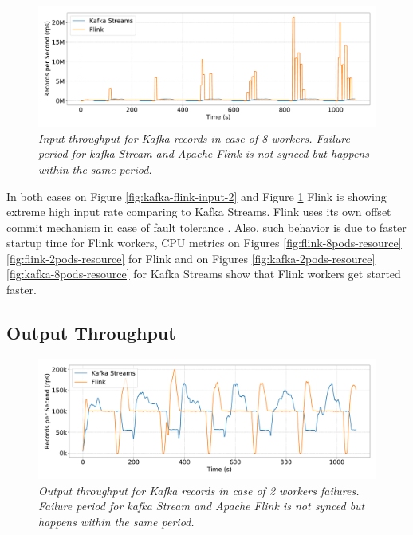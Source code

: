 \begin{figure}[H]
    \centering
    \includegraphics[width=1\textwidth]{figures/kafka-flink/input-throughput-8pod-kafka-flink}
    \caption{\textit{Input throughput for Kafka records in case of 8 workers.
    Failure period for kafka Stream and Apache Flink is not synced but happens within the same period.}}
    \label{fig:kafka-flink-input-8}
\end{figure}


In both cases on Figure \ref{fig:kafka-flink-input-2} and Figure \ref{fig:kafka-flink-input-8}
Flink is showing extreme high input rate comparing to Kafka Streams.
Flink uses its own offset commit mechanism in case of fault tolerance \cite{flink_kafka_offset}.
Also, such behavior is due to faster startup time for Flink workers, CPU metrics
on Figures \ref{fig:flink-8pods-resource} \ref{fig:flink-2pods-resource} for Flink
and on Figures \ref{fig:kafka-2pods-resource} \ref{fig:kafka-8pods-resource} for Kafka Streams
show that Flink workers get started faster.


\subsection{Output Throughput}\label{subsec:output-throughtput}

\begin{figure}[H]
    \centering
    \includegraphics[width=1\textwidth]{figures/kafka-flink/output-throught-2pods-kafka-flink}
    \caption{\textit{Output throughput for Kafka records in case of 2 workers failures.
    Failure period for kafka Stream and Apache Flink is not synced but happens within the same period.}}
    \label{fig:kafka-flink-out-2}
\end{figure}


